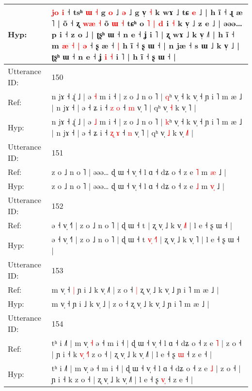 \documentclass[10pt]{article}
\DeclareRobustCommand{\hl}[1]{{\textcolor{red}{#1}}}
\begin{document}
\begin{longtable}{ll}
 \\
Hyp: & \hl{j}\hl{o}\hl{ }\hl{i} ˧ tsʰ \hl{ɯ} \hl{˧} g \hl{}\hl{o} ˩\hl{}\hl{} \hl{}\hl{ə} ˩ g v̩ \hl{˧} k wɤ ˩ tɕ\hl{}\hl{}\hl{}\hl{}\hl{}\hl{} \hl{e} ˩ | h ĩ ˧ ɻ æ ˥ | õ ˧ ʐ \hl{w}\hl{æ} \hl{˧} õ\hl{ }\hl{ɯ} \hl{˧} tɕʰ o\hl{ }\hl{˥} \hl{|} \hl{d} i \hl{˧} k v̩ ˩ z e ˩ | əəə… p i ˧ z o ˩ | ʈʂʰ ɯ ˧ n e ˧ ʝ i ˥ | ʐ wɤ ˩ k v̩ ˩˥ | h ĩ ˧ m\hl{ }\hl{æ}\hl{ }\hl{˧}\hl{ }\hl{|} \hl{ə} ˧ ʂ æ ˧\hl{ }\hl{|} h ĩ ˧ ʂ ɯ ˧ | n jæ ˧ s ɯ ˩ k v̩ ˩ | ʈʂʰ ɯ ˧ n e ˧ ʝ\hl{ }\hl{i}\hl{ }\hl{˧} i ˥ | h ĩ ˧ ʂ ɯ ˧ |
 \\
\midrule
Utterance ID: & 150 \\
Ref: & n jɤ ˧ ɻ̍ ˩ | ə \hl{˧} m i ˧ | z o ˩ n o ˥ | \hl{q}ʰ v̩ ˧ k v̩ ˧ ɲ i ˥ m æ ˩ | n jɤ ˧ | ə ˧ ʑ i ˧ \hl{z} \hl{o} ˧ \hl{m} v̩ ˥ | qʰ v̩ \hl{˧} k v̩ \hl{}˥ |
 \\
Hyp: & n jɤ ˧ ɻ̍ ˩ | ə \hl{˩} m i ˧ | z o ˩ n o ˥ | \hl{k}ʰ v̩ ˧ k v̩ ˧ ɲ i ˥ m æ ˩ | n jɤ ˧ | ə ˧ ʑ i ˧ \hl{ʐ} \hl{ɤ} ˧ \hl{n} v̩ ˥ | qʰ v̩ \hl{˩} k v̩ \hl{˩}˥ |
 \\
\midrule
Utterance ID: & 151 \\
Ref: & z o ˩ n o ˥ | əəə… ɖ ɯ ˧ v̩ ˧ l ɑ ˧ dʑ o ˧ z e \hl{˥} m \hl{}\hl{æ} ˩ |
 \\
Hyp: & z o ˩ n o ˥ | əəə… ɖ ɯ ˧ v̩ ˧ l ɑ ˧ dʑ o ˧ z e \hl{˩} m \hl{v}\hl{̩} ˩ |
 \\
\midrule
Utterance ID: & 152 \\
Ref: & ə ˧ v̩ ˧˥ | z o ˩ n o ˥ | ɖ ɯ ˧ t\hl{}\hl{}\hl{}\hl{}\hl{}\hl{} | ʐ v̩ ˩ k v̩ \hl{˩}˥ | l e ˧ ʂ ɯ ˧ |
 \\
Hyp: & ə ˧ v̩ ˧˥ | z o ˩ n o ˥ | ɖ ɯ ˧ t\hl{ }\hl{v}\hl{̩}\hl{ }\hl{˧}\hl{˥} | ʐ v̩ ˩ k v̩ \hl{}˥ | l e ˧ ʂ ɯ ˧ |
 \\
\midrule
Utterance ID: & 153 \\
Ref: & m v̩ ˧\hl{ }\hl{|} ɲ i ˩ k v̩ ˩\hl{˥} | z o ˧\hl{ }\hl{|} ʐ v̩ ˩ k v̩ ˩ ɲ i ˥ m æ ˩ |
 \\
Hyp: & m v̩ ˧\hl{}\hl{} ɲ i ˩ k v̩ ˩\hl{} | z o ˧\hl{}\hl{} ʐ v̩ ˩ k v̩ ˩ ɲ i ˥ m æ ˩ |
 \\
\midrule
Utterance ID: & 154 \\
Ref: & tʰ i ˩˥ | m v̩\hl{ }\hl{˧} ə ˧ m i ˧ | ɖ ɯ ˧ v̩ ˧ l ɑ ˧ dʑ o ˧ z e \hl{˥} | z o ˧ | ɲ i ˧ k\hl{ }\hl{v}\hl{̩}\hl{ }\hl{˧}\hl{˥} z o ˧ | ʐ v̩ ˩ k v̩ ˩˥ | l e ˧ ʂ \hl{}\hl{ɯ} ˧ z e ˧ |
 \\
Hyp: & tʰ i ˩˥ | m v̩\hl{}\hl{} ə ˧ m i ˧ | ɖ ɯ ˧ v̩ ˧ l ɑ ˧ dʑ o ˧ z e \hl{˩} | z o ˧ | ɲ i ˧ k\hl{}\hl{}\hl{}\hl{}\hl{}\hl{} z o ˧ | ʐ v̩ ˩ k v̩ ˩˥ | l e ˧ ʂ \hl{v}\hl{̩} ˧ z e ˧ |

\end{longtable}
\end{document}
